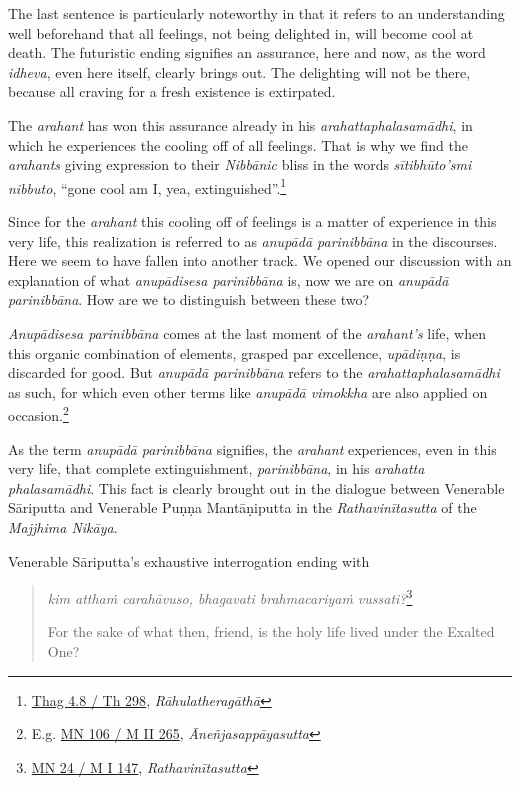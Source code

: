The last sentence is particularly noteworthy in that it refers to an understanding well beforehand that all feelings, not being delighted in, will become cool at death. The futuristic ending signifies an assurance, here and now, as the word \emph{idheva}, even here itself, clearly brings out. The delighting will not be there, because all craving for a fresh existence is extirpated.

The \emph{arahant} has won this assurance already in his \emph{arahattaphalasamādhi}, in which he experiences the cooling off of all feelings. That is why we find the \emph{arahants} giving expression to their \emph{Nibbānic} bliss in the words \emph{sītibhūto'smi nibbuto}, ``gone cool am I, yea, extinguished''.\footnote{\href{https://suttacentral.net/thag4.8/pli/ms}{Thag 4.8 / Th 298}, \emph{Rāhulatheragāthā}}

Since for the \emph{arahant} this cooling off of feelings is a matter of experience in this very life, this realization is referred to as \emph{anupādā parinibbāna} in the discourses. Here we seem to have fallen into another track. We opened our discussion with an explanation of what \emph{anupādisesa parinibbāna} is, now we are on \emph{anupādā parinibbāna}. How are we to distinguish between these two?

\emph{Anupādisesa parinibbāna} comes at the last moment of the \emph{arahant's} life, when this organic combination of elements, grasped par excellence, \emph{upādiṇṇa}, is discarded for good. But \emph{anupādā parinibbāna} refers to the \emph{arahattaphalasamādhi} as such, for which even other terms like \emph{anupādā vimokkha} are also applied on occasion.\footnote{E.g. \href{https://suttacentral.net/mn106/pli/ms}{MN 106 / M II 265}, \emph{Āneñjasappāyasutta}}

As the term \emph{anupādā parinibbāna} signifies, the \emph{arahant} experiences, even in this very life, that complete extinguishment, \emph{parinibbāna}, in his \emph{arahatta phalasamādhi}. This fact is clearly brought out in the dialogue between Venerable Sāriputta and Venerable Puṇṇa Mantāṇiputta in the \emph{Rathavinītasutta} of the \emph{Majjhima Nikāya}.

Venerable Sāriputta's exhaustive interrogation ending with

\begin{quote}
\emph{kim atthaṁ carahāvuso, bhagavati brahmacariyaṁ vussati?}\footnote{\href{https://suttacentral.net/mn24/pli/ms}{MN 24 / M I 147}, \emph{Rathavinītasutta}}

For the sake of what then, friend, is the holy life lived under the Exalted One?
\end{quote}


